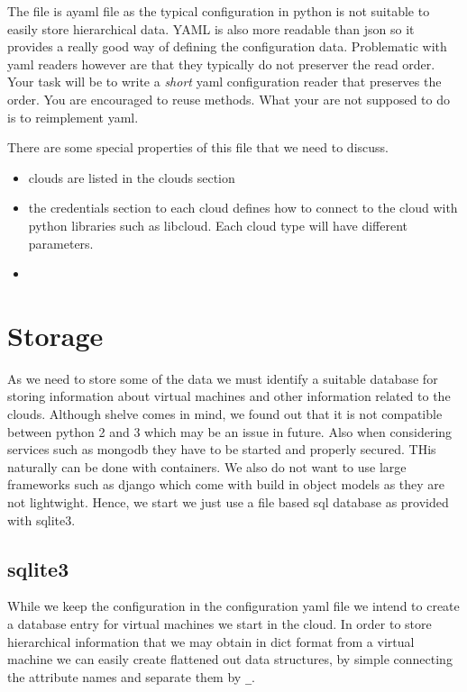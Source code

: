 The file is ayaml file as the typical configuration in python is not
suitable to easily store hierarchical data. YAML is also more readable
than json so it provides a really good way of defining the
configuration data. Problematic with yaml readers however are that
they typically do not preserver the read order. Your task will be to
write a \textit{short} yaml configuration reader that preserves the
order. You are encouraged to reuse methods. What your are not supposed
to do is to reimplement yaml.

There are some special properties of this file that we need to
discuss. 

\begin{itemize}

\item clouds are listed in the clouds section
\item the credentials section to each cloud defines how to connect to
  the cloud with python libraries such as libcloud. Each cloud type will
  have different parameters.
\item 


\end{itemize}



\section{Storage}

As we need to store some of the data we must identify a suitable
database for storing information about virtual machines and other
information related to the clouds. Although shelve comes in mind, we
found out that it is not compatible between python 2 and 3 which may
be an issue in future. Also when considering services such as mongodb
they have to be started and properly secured. THis naturally can be
done with containers. We also do not want to use large frameworks such
as django which come with build in object models as they are not
lightwight. Hence, we start we just use a file based sql
database as provided with sqlite3.

\subsection{sqlite3}

While we keep the configuration in the configuration yaml file we
intend to create a database entry for virtual machines we start in the
cloud. In order to store hierarchical information that we may obtain
in dict format from a virtual machine we can easily create flattened
out data structures, by simple connecting the attribute names and
separate them by \verb|_|.

